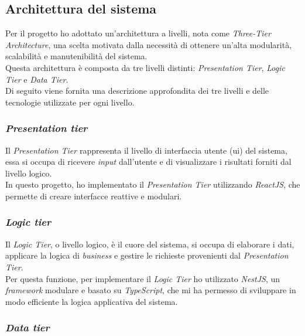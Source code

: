 \subsection{Architettura del sistema}
\label{subsec:architettura}

Per il progetto ho adottato un'architettura a livelli, nota come \textit{Three-Tier Architecture}, una scelta motivata dalla necessità di ottenere un'alta modularità, scalabilità e manutenibilità del sistema.\\
Questa architettura è composta da tre livelli distinti: \textit{Presentation Tier}, \textit{Logic Tier} e \textit{Data Tier}.\\

\noindent Di seguito viene fornita una descrizione approfondita dei tre livelli e delle tecnologie utilizzate per ogni livello.

\subsubsection{\textit{Presentation tier}}

\noindent Il \textit{Presentation Tier} rappresenta il livello di interfaccia utente (\gls{ui}) del sistema,
essa si occupa di ricevere \textit{input} dall'utente e di visualizzare i risultati forniti dal livello logico.\\
In questo progetto, ho implementato il \textit{Presentation Tier} utilizzando \textit{ReactJS}, che permette di creare interfacce reattive e modulari.

\subsubsection{\textit{Logic tier}} 

\noindent Il \textit{Logic Tier}, o livello logico, è il cuore del sistema,
si occupa di elaborare i dati, applicare la logica di \textit{business} e gestire le richieste provenienti dal \textit{Presentation Tier}.\\
Per questa funzione, per implementare il \textit{Logic Tier} ho utilizzato \textit{NestJS}, un \textit{framework} modulare e basato su \textit{TypeScript}, che mi ha permesso di sviluppare in modo efficiente la logica applicativa del sistema.

\subsubsection{\textit{Data tier}} 

